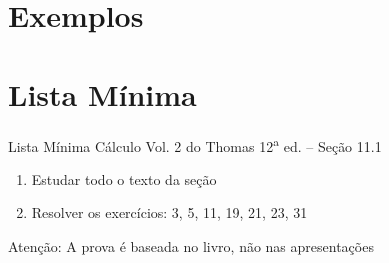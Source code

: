 \section{Exemplos}



\section{Lista Mínima}

\begin{frame}{Lista Mínima}
  Cálculo Vol. 2 do Thomas 12\textsuperscript{a} ed. -- Seção 11.1
  \begin{enumerate}
    \item Estudar todo o texto da seção
    \item Resolver os exercícios: 3, 5, 11, 19, 21, 23, 31
  \end{enumerate}

  \vfill
  Atenção: A prova é baseada no livro, não nas apresentações
\end{frame}


